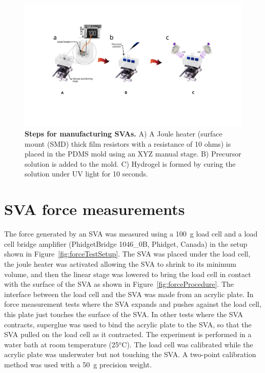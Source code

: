 \begin{figure}[h]
      \centering
      \includegraphics[width=\textwidth]{svaManufacturing.pdf}
      \caption[Steps for manufacturing SVAs]{\textbf{Steps for manufacturing SVAs.} A) A Joule heater (surface mount (SMD) thick film resistors with a resistance of 10 ohms) is placed in the PDMS mold using an XYZ manual stage. B) Precursor solution is added to the mold. C) Hydrogel is formed by curing the solution under UV light for 10 seconds.}
      \label{fig:Manufac}
\end{figure}

\section{SVA force measurements}
The force generated by an SVA was measured using a 100~g load cell and a load cell bridge amplifier (PhidgetBridge 1046_0B, Phidget, Canada) in the setup shown in Figure~\ref{fig:forceTestSetup}. The SVA was placed under the load cell, the joule heater was activated allowing the SVA to shrink to its minimum volume, and then the linear stage was lowered to bring the load cell in contact with the surface of the SVA as shown in Figure~\ref{fig:forceProcedure}. The interface between the load cell and the SVA was made from an acrylic plate. In force measurement tests where the SVA expands and pushes against the load cell, this plate just touches the surface of the SVA. In other tests where the SVA contracts, superglue was used to bind the acrylic plate to the SVA, so that the SVA pulled on the load cell as it contracted. The experiment is performed in a water bath at room temperature (25$^o$C). The load cell was calibrated while the acrylic plate was underwater but not touching the SVA. A two-point calibration method was used with a 50~g precision weight.

